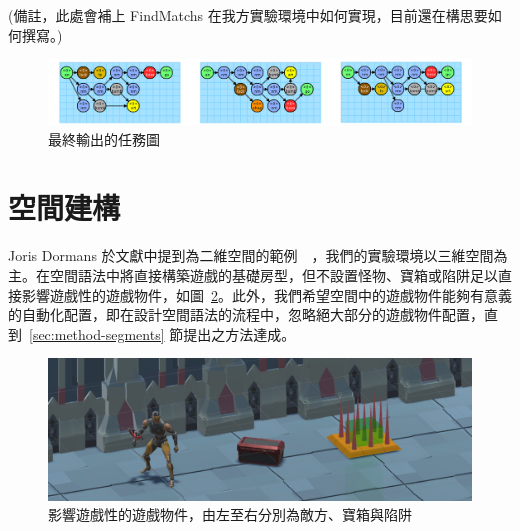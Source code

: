 (備註，此處會補上 FindMatchs 在我方實驗環境中如何實現，目前還在構思要如何撰寫。)


\begin{figure}[ht]
  \begin{center}
    \includegraphics[width=1.0\textwidth]{figures/final-mission-graph.png}
    \caption{最終輸出的任務圖} 
    \label{fig:final-mission-graph}
  \end{center}
\end{figure}

\clearpage

\section{空間建構}
\label{sec:method-spacepieces}

Joris Dormans 於文獻中提到為二維空間的範例~\cite{dormans2010adventures}~\cite{dormans2012engineering}，我們的實驗環境以三維空間為主。在空間語法中將直接構築遊戲的基礎房型，但不設置怪物、寶箱或陷阱足以直接影響遊戲性的遊戲物件，如圖~\ref{fig:gameobject-list}。此外，我們希望空間中的遊戲物件能夠有意義的自動化配置，即在設計空間語法的流程中，忽略絕大部分的遊戲物件配置，直到~\ref{sec:method-segments} 節提出之方法達成。

\begin{figure}[ht]
  \begin{center}
    \includegraphics[width=1.0\textwidth]{figures/gameobject-list.png}
    \caption{影響遊戲性的遊戲物件，由左至右分別為敵方、寶箱與陷阱} 
    \label{fig:gameobject-list}
  \end{center}
\end{figure}

